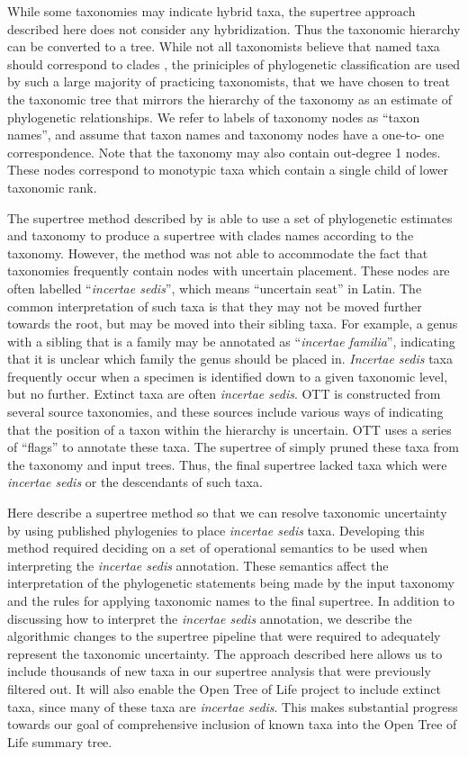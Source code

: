 \documentclass[english]{article}
\begin{document}
While some taxonomies may indicate hybrid taxa, the supertree approach
described here does not consider any hybridization.
Thus the taxonomic
hierarchy can be converted to a tree.
While not all taxonomists
believe that named taxa should correspond to clades \citep[see, for
example,][]{HorandlS2010}, the priniciples of phylogenetic
classification are used by such a large majority of practicing
taxonomists, that we have chosen to treat the taxonomic tree that
mirrors the hierarchy of the taxonomy as an estimate of phylogenetic
relationships.
We refer to labels of taxonomy nodes as ``taxon
names'', and assume that taxon names and taxonomy nodes have a one-to-
one correspondence.
Note that the taxonomy may also contain out-degree
1 nodes.
These nodes correspond to monotypic taxa which contain a
single child of lower taxonomic rank.

The supertree method described by \citet{redelings2017supertree} is
able to use a set of phylogenetic estimates and taxonomy to produce a
supertree with clades names according to the taxonomy.
However, the
method was not able to accommodate the fact that taxonomies frequently
contain nodes with uncertain placement.
These nodes are often labelled
``\emph{incertae sedis}'', which means ``uncertain seat'' in Latin.
The common interpretation of such taxa is that they may not be moved
further towards the root, but may be moved into their sibling taxa.
For example, a genus with a sibling that is a family may be annotated
as ``\emph{incertae familia}'', indicating that it is unclear which
family the genus should be placed in.
\emph{Incertae sedis} taxa
frequently occur when a specimen is identified down to a given
taxonomic level, but no further.
Extinct taxa are often \emph{incertae
sedis}.
OTT is constructed from several source taxonomies, and these
sources include various ways of indicating that the position of a
taxon within the hierarchy is uncertain.
OTT uses a series of
``flags'' to annotate these taxa.
The supertree of \citet{redelings2017supertree} simply pruned these taxa from the
taxonomy and input trees.
Thus, the final supertree lacked taxa which
were \emph{incertae sedis} or the descendants of such taxa.

Here describe a supertree method so that we can resolve taxonomic
uncertainty by using published phylogenies to place \emph{incertae
sedis} taxa.
Developing this method required deciding on a set of
operational semantics to be used when interpreting the \emph{incertae
sedis} annotation.
These semantics affect the interpretation of the
phylogenetic statements being made by the input taxonomy and the rules
for applying taxonomic names to the final supertree.
In addition to
discussing how to interpret the \emph{incertae sedis} annotation,
we describe the algorithmic changes to the supertree pipeline that
were required to adequately represent the taxonomic uncertainty.
The
approach described here allows us to include thousands of new taxa in
our supertree analysis that were previously filtered out.
It will also
enable the Open Tree of Life project to include extinct taxa, since
many of these taxa are \emph{incertae sedis}.
This makes substantial
progress towards our goal of comprehensive inclusion of known taxa
into the Open Tree of Life summary tree.
\end{document}

